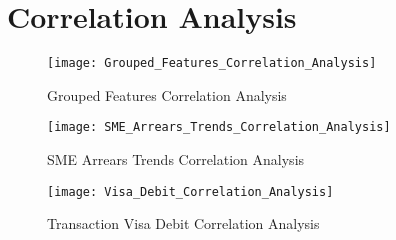 
\chapter{Correlation Analysis} %

\label{AppendixB} %



\begin{figure}[H]
	\texttt{[image: Grouped\_Features\_Correlation\_Analysis]}
	\caption[Grouped Features Correlation Analysis]
	{Grouped Features Correlation Analysis}
	\label{fig:Grouped_Features_Correlation_Analysis}
\end{figure}

\begin{figure}[H]
	\texttt{[image: SME\_Arrears\_Trends\_Correlation\_Analysis]}
	\caption[SME Arrears Trends Correlation Analysis]
	{SME Arrears Trends Correlation Analysis}
	\label{fig:SME_Arrears_Trends_Correlation_Analysis}
\end{figure}
\begin{figure}[H]
	\texttt{[image: Visa\_Debit\_Correlation\_Analysis]}
	\caption[Transaction Visa Debit Correlation Analysis]
	{Transaction Visa Debit Correlation Analysis}
	\label{fig:Transaction_Visa_Debit_Correlation_Analysis}
\end{figure}



